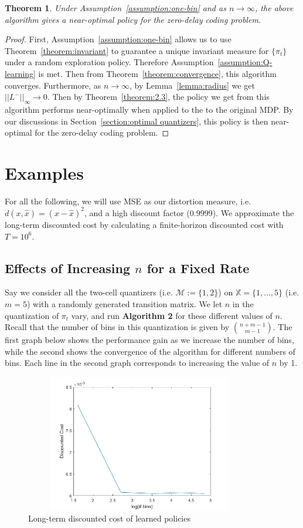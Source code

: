 \documentclass{article}
\newtheorem{theorem}{Theorem}[section]
\begin{document}
\begin{theorem}
    Under Assumption~\ref{assumption:one-bin} and as \(n \to \infty\), the above algorithm gives a near-optimal policy for the zero-delay coding problem.
\end{theorem}
\begin{proof}
    First, Assumption~\ref{assumption:one-bin} allows us to use Theorem~\ref{theorem:invariant} to guarantee a unique invariant measure for \(\{\pi_t\}\) under a random exploration policy. Therefore Assumption~\ref{assumption:Q-learning} is met. Then from Theorem~\ref{theorem:convergence}, this algorithm converges. Furthermore, as \(n \to \infty\), by Lemma~\ref{lemma:radius} we get \(||L^-||_\infty \to 0\). Then by Theorem~\ref{theorem:2.3}, the policy we get from this algorithm performs near-optimally when applied to the to the original MDP. By our discussions in Section~\ref{section:optimal quantizers}, this policy is then near-optimal for the zero-delay coding problem.
\end{proof}

\section{Examples}
For all the following, we will use MSE as our distortion measure, i.e. \( d(x,\hat{x}) = (x - \hat{x})^2 \), and a high discount factor (0.9999). We approximate the long-term discounted cost by calculating a finite-horizon discounted cost with \(T=10^6\).
\subsection{Effects of Increasing \(n\) for a Fixed Rate}
Say we consider all the two-cell quantizers (i.e. \(\mathcal{M} := \{1,2\}\)) on \( \mathbb{X} = \{1,\ldots,5\} \) (i.e. \(m = 5\)) with a randomly generated transition matrix. We let \(n\) in the quantization of \( \pi_t \) vary, and run \textbf{Algorithm 2} for these different values of \(n\). Recall that the number of bins in this quantization is given by \({{n+m-1} \choose {m-1}}\). The first graph below shows the performance gain as we increase the number of bins, while the second shows the convergence of the algorithm for different numbers of bins. Each line in the second graph corresponds to increasing the value of \(n\) by 1.

\begin{figure}[H]
    \centering
    \includegraphics[height=6cm, width=10cm]{cost_5.png}
    \caption{Long-term discounted cost of learned policies}
\end{figure}
\end{document}
